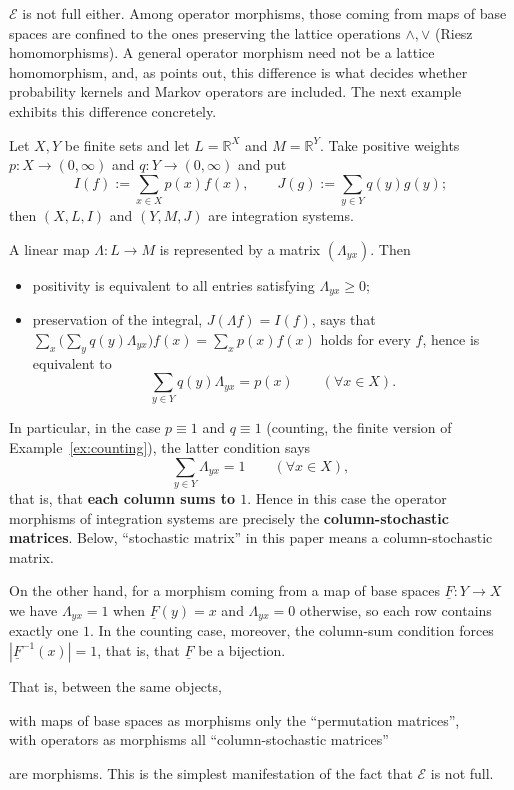 \begin{remark}
  $\mathcal{E}$ is not full either.
  Among operator morphisms, those coming from maps of base spaces are confined
  to the ones preserving the lattice operations $\wedge,\vee$ (Riesz
  homomorphisms).
  A general operator morphism need not be a lattice homomorphism, and, as
  \cite{Yamagami} points out, this difference is what decides whether
  probability kernels and Markov operators are included.
  The next example exhibits this difference concretely.
\end{remark}

\begin{example}\label{ex:stochastic-matrix}
  Let $X,Y$ be finite sets and let $L=\mathbb{R}^X$ and $M=\mathbb{R}^Y$.
  Take positive weights $p:X\to(0,\infty)$ and $q:Y\to(0,\infty)$ and put
  \[
    I(f):=\sum_{x\in X}p(x)f(x),
    \qquad
    J(g):=\sum_{y\in Y}q(y)g(y) ;
  \]
  then $(X,L,I)$ and $(Y,M,J)$ are integration systems.

  A linear map $\Lambda:L\to M$ is represented by a matrix $(\Lambda_{yx})$.
  Then
  \begin{itemize}
    \item positivity is equivalent to all entries satisfying
      $\Lambda_{yx}\ge0$;
    \item preservation of the integral, $J(\Lambda f)=I(f)$, says that
      $\sum_{x}\bigl(\sum_{y}q(y)\Lambda_{yx}\bigr)f(x)=\sum_x p(x)f(x)$ holds
      for every $f$, hence is equivalent to
      \[
        \sum_{y\in Y}q(y)\Lambda_{yx}=p(x)
        \qquad(\forall x\in X) .
      \]
  \end{itemize}

  In particular, in the case $p\equiv1$ and $q\equiv1$ (counting, the finite
  version of Example~\ref{ex:counting}), the latter condition says
  \[
    \sum_{y\in Y}\Lambda_{yx}=1
    \qquad(\forall x\in X) ,
  \]
  that is, that \textbf{each column sums to $1$}.
  Hence in this case the operator morphisms of integration systems are precisely
  the \textbf{column-stochastic matrices}.
  Below, ``stochastic matrix'' in this paper means a column-stochastic matrix.

  On the other hand, for a morphism coming from a map of base spaces
  $\underline{F}:Y\to X$ we have $\Lambda_{yx}=1$ when
  $\underline{F}(y)=x$ and $\Lambda_{yx}=0$ otherwise, so each row contains
  exactly one $1$.
  In the counting case, moreover, the column-sum condition forces
  $|\underline{F}^{-1}(x)|=1$, that is, that $\underline{F}$ be a bijection.

  That is, between the same objects,
  \begin{center}
    with maps of base spaces as morphisms only the ``permutation matrices'',\\
    with operators as morphisms all ``column-stochastic matrices''
  \end{center}
  are morphisms. This is the simplest manifestation of the fact that
  $\mathcal{E}$ is not full.
\end{example}

